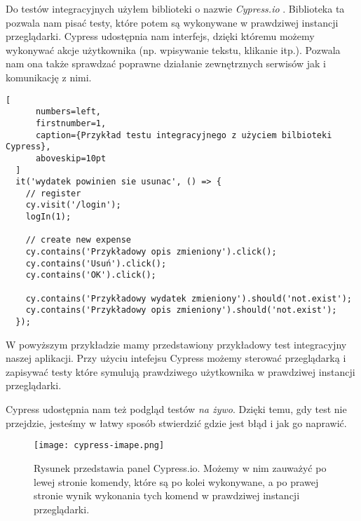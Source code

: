 Do testów integracyjnych użyłem biblioteki o nazwie \emph{Cypress.io} \cite{ref_cypress_doc}. Biblioteka ta pozwala nam pisać testy, które potem są wykonywane w prawdziwej instancji przeglądarki. Cypress udostępnia nam interfejs, dzięki któremu możemy wykonywać akcje użytkownika (np. wpisywanie tekstu, klikanie itp.). Pozwala nam ona także sprawdzać poprawne działanie zewnętrznych serwisów jak i komunikację z nimi. 

  \begin{addmargin}[6mm]{0mm}
  \begin{lstlisting}[
      numbers=left,
      firstnumber=1,
      caption={Przykład testu integracyjnego z użyciem bilbioteki Cypress},
      aboveskip=10pt
  ]
  it('wydatek powinien sie usunac', () => {
    // register
    cy.visit('/login');
    logIn(1);

    // create new expense
    cy.contains('Przykładowy opis zmieniony').click();
    cy.contains('Usuń').click();
    cy.contains('OK').click();

    cy.contains('Przykładowy wydatek zmieniony').should('not.exist');
    cy.contains('Przykładowy opis zmieniony').should('not.exist');
  });
  \end{lstlisting}
  \end{addmargin}
  W powyższym przykładzie mamy przedstawiony przykładowy test integracyjny naszej aplikacji. Przy użyciu intefejsu Cypress możemy sterować przeglądarką i zapisywać testy które symulują prawdziwego użytkownika w prawdziwej instancji przeglądarki.

Cypress udostępnia nam też podgląd testów \emph{na żywo}. Dzięki temu, gdy test nie przejdzie, jesteśmy w łatwy sposób stwierdzić gdzie jest błąd i jak go naprawić.

\begin{figure}
    \texttt{[image: cypress-imape.png]}
    \caption{Rysunek przedstawia panel Cypress.io. Możemy w nim zauważyć po lewej stronie komendy, które są po kolei wykonywane, a po prawej stronie wynik wykonania tych komend w prawdziwej instancji przeglądarki.} \label{fig-cypress}
\end{figure}

